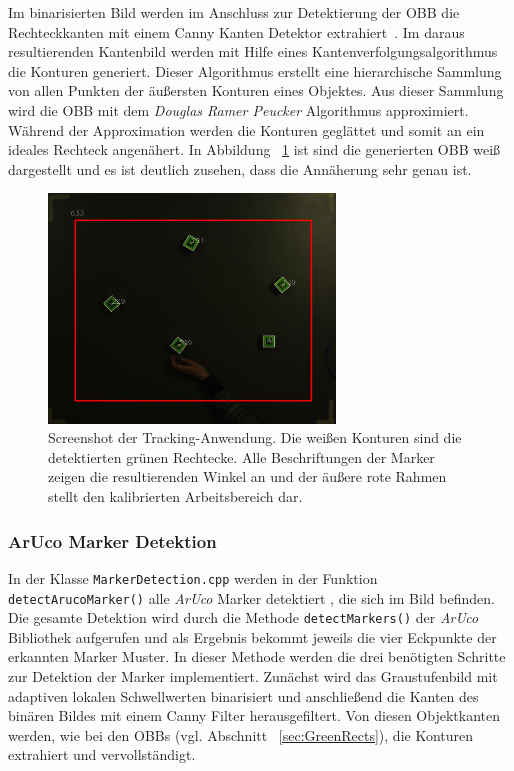 Im binarisierten Bild werden im Anschluss zur Detektierung der OBB die Rechteckkanten mit einem Canny Kanten Detektor extrahiert~\cite{article:Canny}. Im daraus resultierenden Kantenbild werden mit Hilfe eines Kantenverfolgungsalgorithmus \cite{article:FindConturs} die Konturen generiert. Dieser Algorithmus erstellt eine hierarchische Sammlung von allen Punkten der äußersten Konturen eines Objektes. Aus dieser Sammlung wird die OBB mit dem \textit{Douglas Ramer Peucker} Algorithmus \cite{article:RamerPeucker} approximiert. Während der Approximation werden die Konturen geglättet und somit an ein ideales Rechteck angenähert. In Abbildung ~\ref{fig:DebugScreenshot} ist sind die generierten OBB weiß dargestellt und es ist deutlich zusehen, dass die Annäherung sehr genau ist.
\begin{figure}[H]
	\centering
	\includegraphics[width=3in]{Bilder/TrackingScreenshot_x.jpg}
	\caption{Screenshot der Tracking-Anwendung. Die weißen Konturen sind die detektierten grünen Rechtecke. Alle Beschriftungen der Marker zeigen die resultierenden Winkel an und der äußere rote Rahmen stellt den kalibrierten Arbeitsbereich dar.}

	\label{fig:DebugScreenshot}
\end{figure}
\subsubsection{ArUco Marker Detektion}\label{sec:ArucoMarkerTracking}
 In der Klasse \texttt{Marker\-Detection.cpp} werden in der Funktion \texttt{detect\-Aruco\-Marker()} alle \textit{ArUco} Marker detektiert \cite{article:Aruco2014}, die sich im Bild befinden. Die gesamte Detektion wird durch die Methode \texttt{detect\-Markers()} der \textit{ArUco} Bibliothek aufgerufen und als Ergebnis bekommt jeweils die vier Eckpunkte der erkannten Marker Muster. In dieser Methode werden die drei benötigten Schritte zur Detektion der Marker implementiert. Zunächst wird das Graustufenbild mit adaptiven lokalen Schwellwerten binarisiert und anschließend die Kanten des binären Bildes mit einem Canny Filter \cite{article:Canny} herausgefiltert. Von diesen Objektkanten werden, wie bei den OBBs (vgl. Abschnitt ~\ref{sec:GreenRects}), die Konturen extrahiert und vervollständigt.
  

